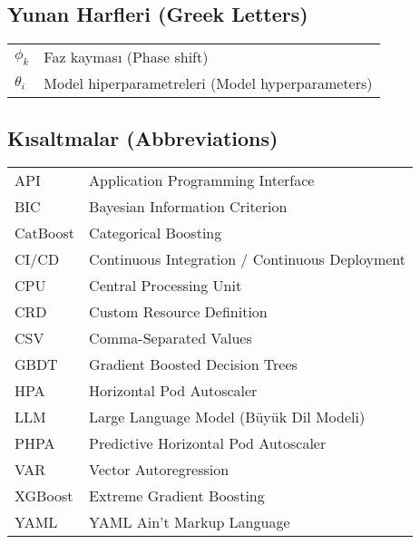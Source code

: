 \subsection{Yunan Harfleri (Greek Letters)}

\begin{tabular}{ll}
$\phi_k$ & Faz kayması (Phase shift) \\
$\theta_i$ & Model hiperparametreleri (Model hyperparameters) \\
\end{tabular}

\subsection{Kısaltmalar (Abbreviations)}

\begin{tabular}{ll}
API & Application Programming Interface \\
BIC & Bayesian Information Criterion \\
CatBoost & Categorical Boosting \\
CI/CD & Continuous Integration / Continuous Deployment \\
CPU & Central Processing Unit \\
CRD & Custom Resource Definition \\
CSV & Comma-Separated Values \\
GBDT & Gradient Boosted Decision Trees \\
HPA & Horizontal Pod Autoscaler \\
LLM & Large Language Model (Büyük Dil Modeli) \\
PHPA & Predictive Horizontal Pod Autoscaler \\
VAR & Vector Autoregression \\
XGBoost & Extreme Gradient Boosting \\
YAML & YAML Ain't Markup Language \\
\end{tabular}

